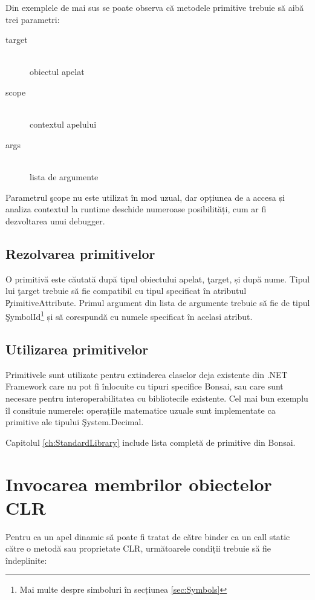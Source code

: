 \documentclass[12pt,a4paper]{memoir}
\begin{document}
Din exemplele de mai sus se poate observa că metodele primitive trebuie să aibă trei parametri:
\begin{description}
\item[target]\hfill\\ obiectul apelat
\item[scope]\hfill\\ contextul apelului
\item[args]\hfill\\ lista de argumente
\end{description}

Parametrul \c{scope} nu este utilizat în mod uzual, dar opțiunea de a accesa și analiza contextul la runtime deschide numeroase posibilități, cum ar fi dezvoltarea unui debugger.

\subsection{Rezolvarea primitivelor}

O primitivă este căutată după tipul obiectului apelat, \c{target}, și după nume. Tipul lui \c{target} trebuie să fie compatibil cu tipul specificat în atributul \c{PrimitiveAttribute}. Primul argument din lista de argumente trebuie să fie de tipul \c{SymbolId}\footnote{Mai multe despre simboluri în secțiunea \ref{sec:Symbols}} și să corespundă cu numele specificat în acelasi atribut.

\subsection{Utilizarea primitivelor}

Primitivele sunt utilizate pentru extinderea claselor deja existente din .NET Framework care nu pot fi înlocuite cu tipuri specifice Bonsai, sau care sunt necesare pentru interoperabilitatea cu bibliotecile existente. Cel mai bun exemplu îl consituie numerele: operațiile matematice uzuale sunt implementate ca primitive ale tipului \c{System.Decimal}.

Capitolul \ref{ch:StandardLibrary} include lista completă de primitive din Bonsai.

\section{Invocarea membrilor obiectelor CLR}

Pentru ca un apel dinamic să poate fi tratat de către binder ca un call static către o metodă sau proprietate CLR, următoarele condiții trebuie să fie îndeplinite:
\end{document}
